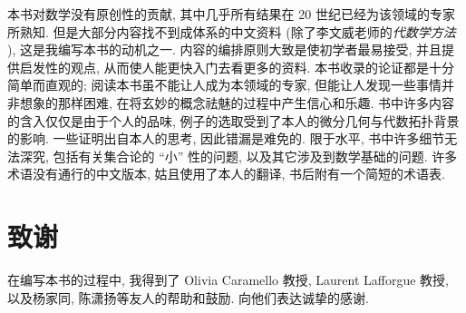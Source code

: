 


本书对数学没有原创性的贡献, 其中几乎所有结果在 20 世纪已经为该领域的专家所熟知. 但是大部分内容找不到成体系的中文资料 (除了李文威老师的\emph{代数学方法} \cite{lww2}), 这是我编写本书的动机之一. 内容的编排原则大致是使初学者最易接受, 并且提供启发性的观点, 从而使人能更快入门去看更多的资料. 本书收录的论证都是十分简单而直观的; 阅读本书虽不能让人成为本领域的专家, 但能让人发现一些事情并非想象的那样困难, 在将玄妙的概念祛魅的过程中产生信心和乐趣. 书中许多内容的含入仅仅是由于个人的品味, 例子的选取受到了本人的微分几何与代数拓扑背景的影响. 一些证明出自本人的思考, 因此错漏是难免的. 限于水平, 书中许多细节无法深究, 包括有关集合论的 ``小'' 性的问题, 以及其它涉及到数学基础的问题. 许多术语没有通行的中文版本, 姑且使用了本人的翻译, 书后附有一个简短的术语表.

\section*{致谢}

在编写本书的过程中, 我得到了 Olivia Caramello 教授, Laurent Lafforgue 教授, 以及杨家同, 陈潇扬等友人的帮助和鼓励.
向他们表达诚挚的感谢.



\newpage

~\vspace{4em}


